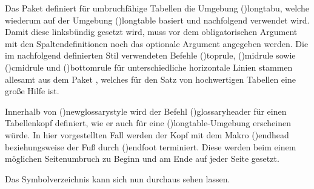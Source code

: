 \documentclass[%
  english,ngerman,%
  cdgeometry=no,DIV=12,%
  cd=false,cdfont=false,cdtitle=true,%
  headings=normal,%
  automark,%
  listof=toc,%
]{tudscrartcl}
\begin{document}
Das Paket  definiert für umbruchfähige Tabellen die Umgebung 
\Environment(){longtabu}, welche wiederum auf der Umgebung 
\Environment(){longtable} basiert und nachfolgend verwendet 
wird. Damit diese linksbündig gesetzt wird, muss vor dem obligatorischen 
Argument mit den Spaltendefinitionen noch das optionale Argument  
angegeben werden. Die im nachfolgend definierten Stil verwendeten Befehle 
\Macro(){toprule}, \Macro(){midrule} sowie
\Macro(){cmidrule} und \Macro(){bottomrule} 
für unterschiedliche horizontale Linien stammen allesamt aus dem Paket 
, welches für den Satz von hochwertigen Tabellen eine große 
Hilfe ist.
%
\CodeHook{\let\newglossarystyle\renewglossarystyle}
\begin{Preamble*}
\end{Preamble*}
%
Innerhalb von \Macro(){newglossarystyle} wird der Befehl 
\Macro(){glossaryheader} für einen Tabellenkopf definiert, 
wie er auch für eine \Environment(){longtable}-Umgebung 
erscheinen würde. In hier vorgestellten Fall werden der Kopf mit dem Makro 
\Macro(){endhead} beziehungsweise der Fuß durch 
\Macro(){endfoot} terminiert. Diese werden beim 
einem möglichen Seitenumbruch zu Beginn und am Ende auf jeder Seite gesetzt.
%
\begin{Preamble+}
}%

\end{Preamble+}
%
Das Symbolverzeichnis kann sich nun durchaus sehen lassen.
%
\begin{Hint}
\printsymbols[style=symblongtabu]
\end{Hint}
\begin{quoting}[rightmargin=0pt]
\printsymbols[style=symbtabu]
\end{quoting}
\end{document}
